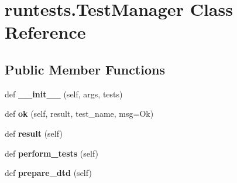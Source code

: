 \hypertarget{classruntests_1_1_test_manager}{}\section{runtests.\+Test\+Manager Class Reference}
\label{classruntests_1_1_test_manager}
\subsection*{Public Member Functions}
\begin{DoxyCompactItemize}
\item 
\mbox{\label{classruntests_1_1_test_manager_a1f5275eb2126a2ae09fdee32c028b264}} 
def {\bfseries \+\_\+\+\_\+init\+\_\+\+\_\+} (self, args, tests)
\item 
\mbox{\label{classruntests_1_1_test_manager_a2fb3237efadba13672ebee6f13f8df87}} 
def {\bfseries ok} (self, result, test\+\_\+name, msg=\textquotesingle{}Ok\textquotesingle{})
\item 
\mbox{\label{classruntests_1_1_test_manager_abf65e6b48a660b3e15967849bfd6cc94}} 
def {\bfseries result} (self)
\item 
\mbox{\label{classruntests_1_1_test_manager_ac69f4bfe5102bf37097743522b1c40ff}} 
def {\bfseries perform\+\_\+tests} (self)
\item 
\mbox{\label{classruntests_1_1_test_manager_acd084674ffec684d8e2ddeeca95b6142}} 
def {\bfseries prepare\+\_\+dtd} (self)
\end{DoxyCompactItemize}
